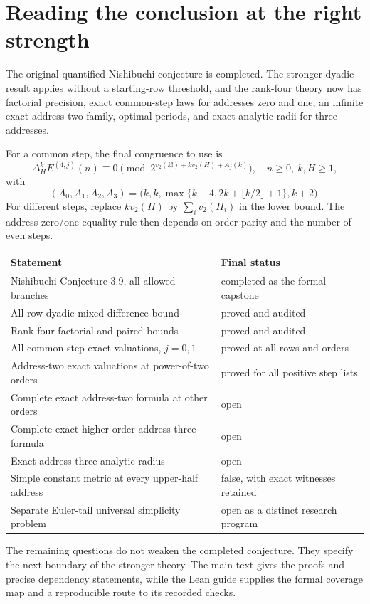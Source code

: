 \clearpage
\section{Reading the conclusion at the right strength}

The original quantified Nishibuchi conjecture is completed. The stronger
dyadic result applies without a starting-row threshold, and the rank-four
theory now has factorial precision, exact common-step laws for addresses zero
and one, an infinite exact address-two family, optimal periods, and exact
analytic radii for three addresses.

For a common step, the final congruence to use is
\[
 \Delta_H^k E^{(4,j)}(n)
 \equiv0\pmod {2^{v_2(k!)+k v_2(H)+A_j(k)}},
 \quad n\ge0,\ k,H\ge1,
\]
with
\[
 (A_0,A_1,A_2,A_3)
 =\bigl(k,k,\max\{k+4,2k+\lfloor k/2\rfloor+1\},k+2\bigr).
\]
For different steps, replace $k v_2(H)$ by $\sum_i v_2(H_i)$ in the lower
bound. The address-zero/one equality rule then depends on order parity and the
number of even steps.

\begin{center}
\begin{tabular}{p{.55\linewidth}p{.35\linewidth}}
\toprule
Statement & Final status \\
\midrule
Nishibuchi Conjecture 3.9, all allowed branches & completed as the formal capstone \\
All-row dyadic mixed-difference bound & proved and audited \\
Rank-four factorial and paired bounds & proved and audited \\
All common-step exact valuations, $j=0,1$ & proved at all rows and orders \\
Address-two exact valuations at power-of-two orders & proved for all positive step lists \\
Complete exact address-two formula at other orders & open \\
Complete exact higher-order address-three formula & open \\
Exact address-three analytic radius & open \\
Simple constant metric at every upper-half address & false, with exact witnesses retained \\
Separate Euler-tail universal simplicity problem & open as a distinct research program \\
\bottomrule
\end{tabular}
\end{center}

The remaining questions do not weaken the completed conjecture. They specify
the next boundary of the stronger theory. The main text gives the proofs and
precise dependency statements, while the Lean guide supplies the formal
coverage map and a reproducible route to its recorded checks.
